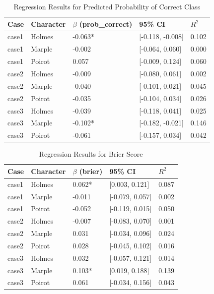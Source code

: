\documentclass{article}
\begin{document}
\begin{table}[H]
\centering
\begin{tabular}{l l l l l}\toprule
\textbf{Case} & \textbf{Character} & \textbf{$\beta$ (prob\_correct)}& \textbf{95\% CI} & \textbf{$R^2$}\\\midrule
case1 & Holmes & -0.063* & [-0.118, -0.008] & 0.102 \\
case1 & Marple & -0.002 & [-0.064, 0.060] & 0.000 \\
case1 & Poirot & 0.057 & [-0.009, 0.124] & 0.060 \\
case2 & Holmes & -0.009 & [-0.080, 0.061] & 0.002 \\
case2 & Marple & -0.040 & [-0.101, 0.021] & 0.045 \\
case2 & Poirot & -0.035 & [-0.104, 0.034] & 0.026 \\
case3 & Holmes & -0.039 & [-0.118, 0.041] & 0.025 \\
case3 & Marple & -0.102* & [-0.182, -0.021] & 0.146 \\
case3 & Poirot & -0.061 & [-0.157, 0.034] & 0.042 \\ \bottomrule
\end{tabular}
\caption{Regression Results for Predicted Probability of Correct Class}
\label{prob_correct}
\end{table}


\begin{table}[H]
\centering
\begin{tabular}{l l l l l}\toprule
\textbf{Case} & \textbf{Character} & \textbf{$\beta$ (brier)}& \textbf{95\% CI} & \textbf{$R^2$}\\\midrule
case1 & Holmes & 0.062* & [0.003, 0.121] & 0.087 \\
case1 & Marple & -0.011 & [-0.079, 0.057] & 0.002 \\
case1 & Poirot & -0.052 & [-0.119, 0.015] & 0.050 \\
case2 & Holmes & -0.007 & [-0.083, 0.070] & 0.001 \\
case2 & Marple & 0.031 & [-0.034, 0.096] & 0.024 \\
case2 & Poirot & 0.028 & [-0.045, 0.102] & 0.016 \\
case3 & Holmes & 0.032 & [-0.057, 0.121] & 0.014 \\
case3 & Marple & 0.103* & [0.019, 0.188] & 0.139 \\
case3 & Poirot & 0.061 & [-0.034, 0.156] & 0.043 \\ \bottomrule
\end{tabular}
\caption{Regression Results for Brier Score}
\label{brier_score}
\end{table}
\end{document}
